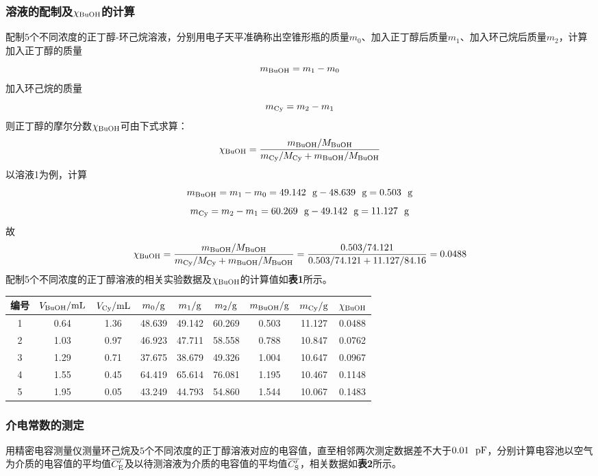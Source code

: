 \documentclass[12pt]{article}
\begin{document}
\subsubsection{溶液的配制及$\chi_{\rm BuOH}$的计算} 
 配制$5$个不同浓度的正丁醇-环己烷溶液，分别用电子天平准确称出空锥形瓶的质量$m_{0}$、加入正丁醇后质量$m_{1}$、加入环己烷后质量$m_{2}$，计算加入正丁醇的质量
 $$
 m_{\rm BuOH}=m_{1}-m_{0}
 $$
 加入环己烷的质量
 $$
 m_{\rm Cy}=m_{2}-m_{1}
 $$
 则正丁醇的摩尔分数$\chi_{\rm BuOH}$可由下式求算：
 $$
 \chi_{\rm BuOH}=\frac{m_{\rm BuOH} / M_{\rm BuOH}}{m_{\rm Cy} / M_{\rm Cy}+m_{\rm BuOH} / M_{\rm BuOH}}
 $$
 以溶液1为例，计算
 $$
 m_{\rm BuOH}=m_{1}-m_{0}=49.142\ \ {\rm g}-48.639\ \ {\rm g}=0.503\ \ {\rm g}
 $$
 $$
 m_{\rm Cy}=m_{2}-m_{1}=60.269\ \ {\rm g}-49.142\ \ {\rm g}=11.127\ \ {\rm g}
 $$
 故
 $$
 \chi_{\rm BuOH}=\frac{m_{\rm BuOH} / M_{\rm BuOH}}{m_{\rm Cy} / M_{\rm Cy}+m_{\rm BuOH} / M_{\rm BuOH}}=\frac{0.503 / 74.121}{0.503 / 74.121+ 11.127/ 84.16}=0.0488
 $$
 配制5个不同浓度的正丁醇溶液的相关实验数据及$\chi_{\rm BuOH}$的计算值如\textbf{表1}所示。
\begin{table}[h]
	\centering
	\begin{tabular}{ccccccccc}
		\toprule
		编号 & $V_{\rm BuOH}/{\rm mL}$ & $V_{\rm Cy}/{\rm mL}$ & $m_{0}/{\rm g}$ & $m_{1}/{\rm g}$ & $m_{2}/{\rm g}$ & $m_{\rm BuOH}/{\rm g}$ & $m_{\rm Cy}/{\rm g}$ & $\chi_{\rm BuOH}$ \\
		\midrule
		1 & 0.64 & 1.36 & 48.639 & 49.142 & 60.269 & 0.503 & 11.127 & 0.0488 \\
		2 & 1.03 & 0.97 & 46.923 & 47.711 & 58.558 & 0.788 & 10.847 & 0.0762 \\
		3 & 1.29 & 0.71 & 37.675 & 38.679 & 49.326 & 1.004 & 10.647 & 0.0967 \\
		4 & 1.55 & 0.45 & 64.419 & 65.614 & 76.081 & 1.195 & 10.467 & 0.1148 \\
		5 & 1.95 & 0.05 & 43.249 & 44.793 & 54.860 & 1.544 & 10.067 & 0.1483 \\
		\bottomrule
	\end{tabular}
\end{table}
\par


\subsubsection{介电常数的测定}
用精密电容测量仪测量环己烷及$5$个不同浓度的正丁醇溶液对应的电容值，直至相邻两次测定数据差不大于$0.01\ \ {\rm pF}$，分别计算电容池以空气为介质的电容值的平均值$\overline{C^{\prime}_{\rm E}}$及以待测溶液为介质的电容值的平均值$\overline{C^{\prime}_{\rm S}}$，相关数据如\textbf{表2}所示。
\end{document}
